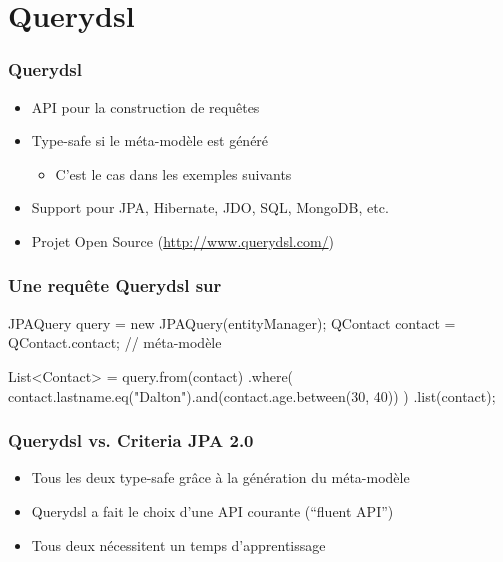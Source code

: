 \section{Querydsl}



\begin{frame}
 \frametitle{Querydsl}
 \begin{itemize}
  \item API pour la construction de requêtes
  \item Type-safe si le méta-modèle est généré
  \begin{itemize}
   \item C'est le cas dans les exemples suivants
  \end{itemize}
  \item Support pour JPA, Hibernate, JDO, SQL, MongoDB, etc.
  \item Projet Open Source (\url{http://www.querydsl.com/})
 \end{itemize}
\end{frame}

\begin{frame}[fragile]
 \frametitle{Une requête Querydsl sur }

 \begin{javacode}
JPAQuery query = new JPAQuery(entityManager);
QContact contact = QContact.contact; // m\'eta-mod\`ele

List<Contact> = query.from(contact)
  .where(
    contact.lastname.eq("Dalton").and(contact.age.between(30, 40))
  )
  .list(contact);		
 \end{javacode}
\end{frame}

\begin{frame}
 \frametitle{Querydsl vs. Criteria JPA 2.0}

 \begin{itemize}
  \item Tous les deux type-safe grâce à la génération du méta-modèle
  \item Querydsl a fait le choix d'une API courante (``fluent API'')
  \item Tous deux nécessitent un temps d'apprentissage
 \end{itemize}

\end{frame}

